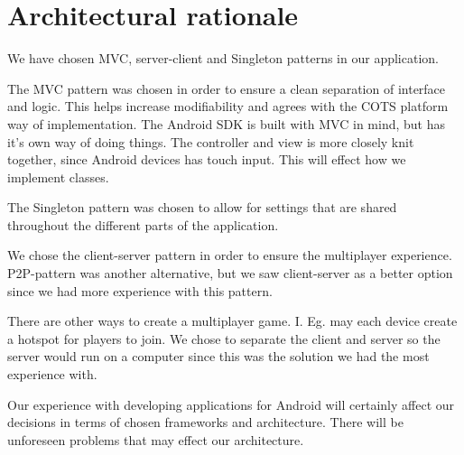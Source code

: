 \section{Architectural rationale}
\label{sec:architecturalrationale}

We have chosen MVC, server-client and Singleton patterns in our application.

The MVC pattern was chosen in order to ensure a clean separation of interface and logic. This helps increase modifiability and agrees with the COTS platform way of implementation. The Android SDK is built with MVC in mind, but has it's own way of doing things. The controller and view is more closely knit together, since Android devices has touch input. This will effect how we implement classes. 

The Singleton pattern was chosen to allow for settings that are shared throughout the different parts of the application.

We chose the client-server pattern in order to ensure the multiplayer experience. P2P-pattern was another alternative, but we saw client-server as a better option since we had more experience with this pattern.

There are other ways to create a multiplayer game. I. Eg. may each device create a hotspot for players to join. We chose to separate the client and server so the server would run on a computer since this was the solution we had the most experience with. 

Our experience with developing applications for Android will certainly affect our decisions in terms of chosen frameworks and architecture. There will be unforeseen problems that may effect our architecture. 


